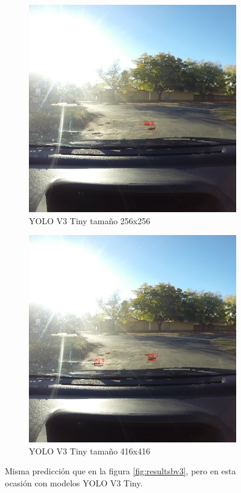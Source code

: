 \begin{figure}[H]
	\centering
	\begin{subfigure}[h]{0.45\linewidth}
		\includegraphics[width=\linewidth]{images/results_b_yolo_v3_tiny_256.jpg}
		\caption{YOLO V3 Tiny tamaño 256x256}
	\end{subfigure}
	\begin{subfigure}[h]{0.45\linewidth}
		\includegraphics[width=\linewidth]{images/results_b_yolo_v3_tiny_416.jpg}
		\caption{YOLO V3 Tiny tamaño 416x416}
	\end{subfigure}
	\caption{Misma predicción que en la figura \ref{fig:resultsbv3}, pero en esta ocasión con modelos YOLO V3 Tiny.}
	\label{fig:resultsbv3tiny}
\end{figure}

